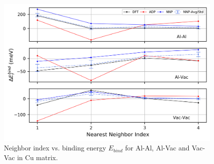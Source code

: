 \documentclass{article}
\begin{document}
\begin{figure}[H]%
\centering%
\includegraphics[width=1\textwidth,center]{./figures/solsol_in_cu.png}%
\caption{Neighbor index vs. binding energy $E_{bind}$ for Al-Al, Al-Vac and Vac-Vac in Cu matrix.}%
\label{fig:solsol_in_cu}
\end{figure}
\end{document}
